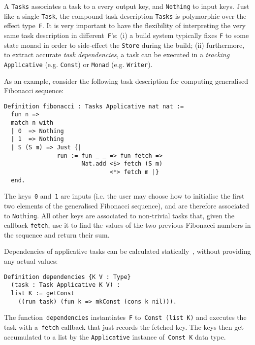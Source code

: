 \documentclass[sigplan,review]{acmart}\settopmatter{printfolios=true,printccs=false,printacmref=false}
\newcommand{\hs}{\texttt}
\newcommand{\coq}{\texttt}
\begin{document}
A \hs{Tasks} associates a task to a every output key, and \hs{Nothing} to input
keys. Just like a single \hs{Task}, the compound task description \hs{Tasks} is
polymorphic over the effect type~\hs{F}. It is very important to have the
flexibility of interpreting the very same task description in
different~\hs{F}'s: (i) a build system typically fixes \hs{F} to some state
monad in order to side-effect the \hs{Store} during the build; (ii) furthermore,
to extract accurate \emph{task dependencies}, a task can be executed in a
\emph{tracking} \hs{Applicative} (e.g. \hs{Const}) or \hs{Monad}
(e.g. \hs{Writer}).

As an example, consider the following task description for computing generalised
Fibonacci sequence:

\vspace{-1mm}
\begin{verbatim}
Definition fibonacci : Tasks Applicative nat nat :=
  fun n =>
  match n with
  | 0  => Nothing
  | 1  => Nothing
  | S (S m) => Just {|
               run := fun _ _ => fun fetch =>
                      Nat.add <$> fetch (S m)
                              <*> fetch m |}
  end.
\end{verbatim}
\vspace{-1mm}

\noindent
The keys~\coq{0} and~\coq{1} are inputs (i.e. the user may choose
how to initialise the first two elements of the generalised Fibonacci sequence),
and are therefore associated to \hs{Nothing}. All other keys are associated to
non-trivial tasks that, given the callback \hs{fetch}, use it to find the values
of the two previous Fibonacci numbers in the sequence and return their sum.

Dependencies of applicative tasks can be calculated
statically~\cite{free-applicatives}, without providing any actual values:

\vspace{-1mm}
\begin{verbatim}
Definition dependencies {K V : Type}
  (task : Task Applicative K V) :
  list K := getConst
    ((run task) (fun k => mkConst (cons k nil))).
\end{verbatim}
\vspace{-1mm}

\noindent
The function~\hs{dependencies} instantiates~\hs{F} to~\hs{Const (list K)} and
executes the task with a~\hs{fetch} callback that just records the fetched key.
The keys then get accumulated to a list by the \hs{Applicative} instance
of~\hs{Const K} data type.
\end{document}
